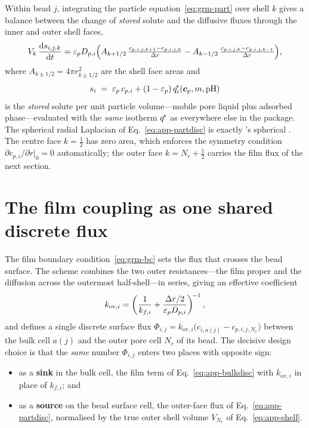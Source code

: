 Within bead $j$, integrating the particle equation~\eqref{eq:grm-part} over shell
$k$ gives a balance between the change of \emph{stored} solute and the diffusive
fluxes through the inner and outer shell faces,
%
\begin{equation}
V_k\,\frac{\mathrm{d} s_{i,j,k}}{\mathrm{d} t}
  = \varepsilon_p D_{p,i}\Bigl(A_{k+1/2}\,\tfrac{c_{p,i,j,k+1}-c_{p,i,j,k}}{\Delta r}
                       - A_{k-1/2}\,\tfrac{c_{p,i,j,k}-c_{p,i,j,k-1}}{\Delta r}\Bigr),
\label{eq:app-partdisc}
\end{equation}
%
where $A_{k\pm1/2}=4\pi r_{k\pm1/2}^2$ are the shell face areas and
%
\begin{equation}
s_{i} \;=\; \varepsilon_p\,c_{p,i} + (1-\varepsilon_p)\,q^{\!*}_i(\bm c_p, m, \mathrm{pH})
\label{eq:app-storage}
\end{equation}
%
is the \emph{stored} solute per unit particle volume---mobile pore liquid plus
adsorbed phase---evaluated with the \emph{same} isotherm $q^{\!*}$ as everywhere
else in the package. The spherical radial Laplacian of
Eq.~\eqref{eq:app-partdisc} is exactly 's spherical
. The centre face $k=\tfrac12$ has zero area, which enforces
the symmetry condition $\partial c_{p,i}/\partial r|_{0}=0$ automatically; the
outer face $k=N_r+\tfrac12$ carries the film flux of the next section.

\section{The film coupling as one shared discrete flux}
\label{app:grm-film}

The film boundary condition~\eqref{eq:grm-bc} sets the flux that crosses the bead
surface. The scheme combines the two outer resistances---the film proper and the
diffusion across the outermost half-shell---in series, giving an effective
coefficient
%
\begin{equation}
k_{\mathrm{ov},i}
  = \left(\frac{1}{k_{f,i}} + \frac{\Delta r/2}{\varepsilon_p D_{p,i}}\right)^{\!-1},
\label{eq:app-kov}
\end{equation}
%
and defines a single discrete surface flux
$\Phi_{i,j}=k_{\mathrm{ov},i}\bigl(c_{i,a(j)}-c_{p,i,j,N_r}\bigr)$ between the bulk
cell $a(j)$ and the outer pore cell $N_r$ of its bead. The decisive design choice
is that the \emph{same} number $\Phi_{i,j}$ enters two places with opposite sign:

\begin{itemize}
  \item as a \textbf{sink} in the bulk cell, the film term of
  Eq.~\eqref{eq:app-bulkdisc} with $k_{\mathrm{ov},i}$ in place of $k_{f,i}$; and
  \item as a \textbf{source} on the bead surface cell, the outer-face flux of
  Eq.~\eqref{eq:app-partdisc}, normalised by the true outer shell volume
  $V_{N_r}$ of Eq.~\eqref{eq:app-shell}.
\end{itemize}

